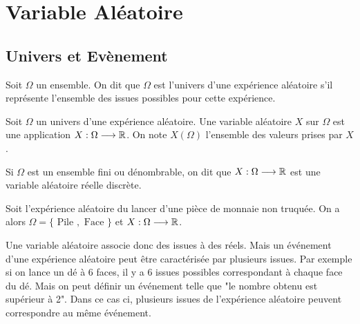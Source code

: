 


\section{Variable Aléatoire}

\subsection{Univers et Evènement}

\begin{definition}[Univers]
    Soit $\Omega$ un ensemble. On dit que $\Omega$ est l'univers d'une expérience aléatoire s'il représente 
    l'ensemble des issues possibles pour cette expérience. 
\end{definition}

\begin{definition}
    Soit $\Omega$ un univers d'une expérience aléatoire. Une variable aléatoire $X$ sur $\Omega$ 
    est une application $X : \Omega \longrightarrow \mathbb{R}$. On note $X(\Omega)$ l'ensemble des valeurs prises par $X$. 
\end{definition}

\begin{remark}
    Si $\Omega$ est un ensemble fini ou dénombrable, on dit que $X : \Omega \longrightarrow \mathbb{R}$ est une variable aléatoire réelle discrète. 
\end{remark}

\begin{example}
    Soit l'expérience aléatoire du lancer d'une pièce de monnaie non truquée. 
    On a alors $\Omega = \{\text{ Pile }, \text{ Face }\}$ et $X : \Omega \longrightarrow \mathbb{R}$. 
\end{example}

Une variable aléatoire associe donc des issues à des réels. Mais un événement d'une expérience aléatoire peut être 
caractérisée par plusieurs issues. Par exemple si on lance un dé à 6 faces, il y a 6 issues possibles correspondant 
à chaque face du dé. Mais on peut définir un événement telle que "le nombre obtenu est supérieur à 2". 
Dans ce cas ci, plusieurs issues de l'expérience aléatoire peuvent correspondre au même événement. 

